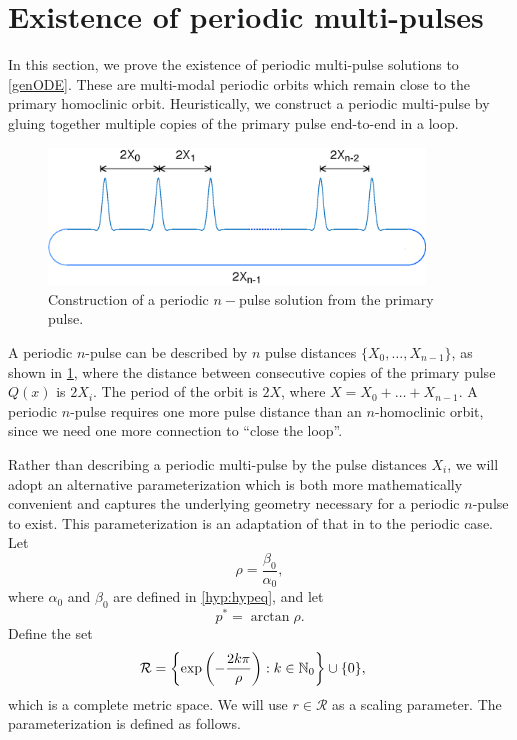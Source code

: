 \documentclass[10pt,reqno]{amsart}
\theoremstyle{plain}
\theoremstyle{definition}
\theoremstyle{remark}
\numberwithin{theorem}{section}
\numberwithin{equation}{section}
\begin{document}
\section{Existence of periodic multi-pulses}\label{sec:perexist}

In this section, we prove the existence of periodic multi-pulse solutions to \cref{genODE}. These are multi-modal periodic orbits which remain close to the primary homoclinic orbit. Heuristically, we construct a periodic multi-pulse by gluing together multiple copies of the primary pulse end-to-end in a loop.
\begin{figure}[H]
\begin{center}
\includegraphics[width=10cm]{images/multipulseperiodic}
\end{center}
\caption[Construction of a periodic $n$-pulse solution]{Construction of a periodic $n-$pulse solution from the primary pulse.}
\label{fig:permultipulse}
\end{figure}
A periodic $n$-pulse can be described by $n$ pulse distances $\{X_0, \dots, X_{n-1} \}$, as shown in \cref{fig:permultipulse}, where the distance between consecutive copies of the primary pulse $Q(x)$ is $2 X_i$. The period of the orbit is $2X$, where $X = X_0 + \dots + X_{n-1}$. A periodic $n$-pulse requires one more pulse distance than an $n$-homoclinic orbit, since we need one more connection to ``close the loop''.  

Rather than describing a periodic multi-pulse by the pulse distances $X_i$, we will adopt an alternative parameterization which is both more mathematically convenient and captures the underlying geometry necessary for a periodic $n$-pulse to exist. This parameterization is an adaptation of that in \cite{SandstedeStrut,Sandstede1998} to the periodic case. Let
\begin{equation}\label{defrho}
\rho = \frac{\beta_0}{\alpha_0},
\end{equation}
where $\alpha_0$ and $\beta_0$ are defined in \cref{hyp:hypeq}, and let
\begin{equation}\label{pstar}
p^* = \arctan \rho.
\end{equation}
Define the set
\begin{align}
\mathcal{R} &= \left\{ \mathop\mathrm{exp}\nolimits\left(-\frac{2 k \pi}{\rho}\right) : k \in \mathbb{N}_0 \right\} \cup \{ 0 \},
\end{align}
which is a complete metric space. We will use $r \in \mathcal{R}$ as a scaling parameter. The parameterization is defined as follows.
\end{document}
